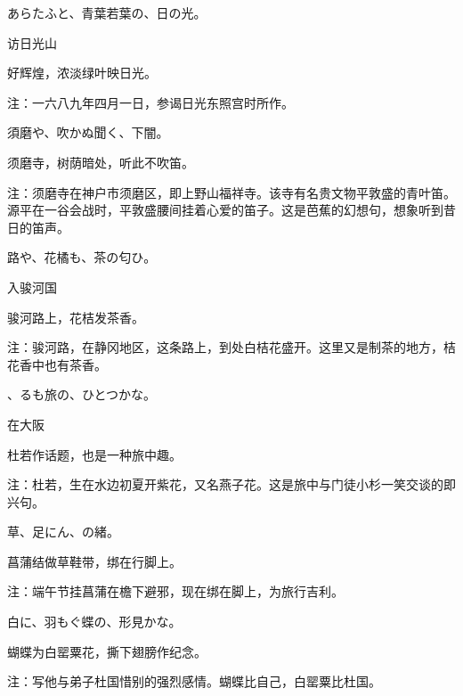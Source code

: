 \begin{haiku}
    {\FH あらたふと、青葉若葉の、日の光。}

    {\FK 访日光山}

    {\FK 好辉煌，浓淡绿叶映日光。}

    {\FT 注：一六八九年四月一日，参谒日光东照宫时所作。}
\end{haiku}

\begin{haiku}
    {\FH 須磨や、吹かぬ聞く、下闇。}

    {\FK 须磨寺，树荫暗处，听此不吹笛。}

    {\FT 注：须磨寺在神户市须磨区，即上野山福祥寺。该寺有名贵文物平敦盛的青叶笛。源平在一谷会战时，平敦盛腰间挂着心爱的笛子。这是芭蕉的幻想句，想象听到昔日的笛声。}
\end{haiku}

\begin{haiku}
    {\FH {}路や、花橘も、茶の匂ひ。}

    {\FK 入骏河国}

    {\FK 骏河路上，花桔发茶香。}

    {\FT 注：骏河路，在静冈地区，这条路上，到处白桔花盛开。这里又是制茶的地方，桔花香中也有茶香。}
\end{haiku}

\begin{haiku}
    {\FH {}、るも旅の、ひとつかな。}

    {\FK 在大阪}

    {\FK 杜若作话题，也是一种旅中趣。}

    {\FT 注：杜若，生在水边初夏开紫花，又名燕子花。这是旅中与门徒小杉一笑交谈的即兴句。}
\end{haiku}

\begin{haiku}
    {\FH {}草、足にん、の緒。}

    {\FK 菖蒲结做草鞋带，绑在行脚上。}

    {\FT 注：端午节挂菖蒲在檐下避邪，现在绑在脚上，为旅行吉利。}
\end{haiku}

\begin{haiku}
    {\FH 白に、羽もぐ蝶の、形見かな。}

    {\FK 蝴蝶为白罂粟花，撕下翅膀作纪念。}

    {\FT 注：写他与弟子杜国惜别的强烈感情。蝴蝶比自己，白罂粟比杜国。}
\end{haiku}

